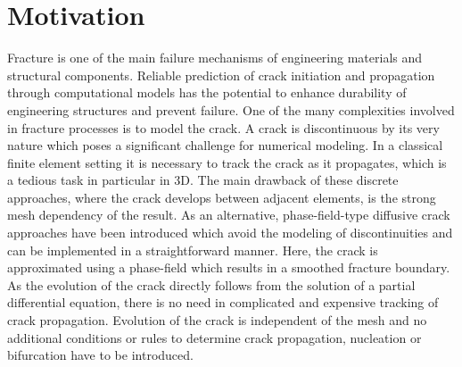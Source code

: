 \chapter{Motivation}
Fracture is one of the main failure mechanisms of engineering materials and structural components. Reliable prediction of crack initiation and propagation through computational models has the potential to enhance durability of engineering structures and prevent failure. One of the many complexities involved in fracture processes is to model the crack. A crack is discontinuous by its very nature which poses a significant challenge for numerical modeling. In a classical finite element setting it is necessary to track the crack as it propagates, which is a tedious task in particular in 3D. The main drawback of these discrete approaches, where the crack develops between adjacent elements, is the strong mesh dependency of the result. As an alternative, phase-field-type diffusive crack approaches have been introduced which avoid the modeling of discontinuities and can be implemented in a straightforward manner. Here, the crack is approximated using a phase-field which results in a smoothed fracture boundary. As the evolution of the crack directly follows from the solution of a partial differential equation, there is no need in complicated and expensive tracking of crack propagation. Evolution of the crack is independent of the mesh and no additional conditions or rules to determine crack propagation, nucleation or bifurcation have to be introduced.


